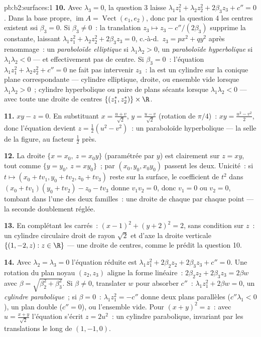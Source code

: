 \begin{solution}{pb:b2:surfaces:1}
\textbf{10.} Avec $\lambda_3 = 0$, la question 3 laisse
$\lambda_1z_1^2 + \lambda_2z_2^2 + 2\beta_3z_3 + c'' = 0$. Dans
la base propre, $\operatorname{im}A = \operatorname{Vect}(e_1,
e_2)$, donc par la question 4 les centres existent ssi $\beta_3 = 0$. Si
$\beta_3 \neq 0$~: la translation $z_3 \mapsto z_3 -
c''/(2\beta_3)$ supprime la constante, laissant $\lambda_1z_1^2
+ \lambda_2z_2^2 + 2\beta_3z_3 = 0$, c.-à-d.\ $z_3 = px^2 +
qy^2$ après renommage~: un \emph{paraboloïde elliptique} si
$\lambda_1\lambda_2 > 0$, un \emph{paraboloïde hyperbolique} si
$\lambda_1\lambda_2 < 0$ --- et effectivement pas de centre. Si
$\beta_3 = 0$~: l'équation $\lambda_1z_1^2 + \lambda_2z_2^2 +
c'' = 0$ ne fait pas intervenir $z_3$~: la  est un cylindre
sur la conique plane correspondante --- cylindre elliptique,
droite, ou ensemble vide lorsque $\lambda_1\lambda_2 > 0$~; cylindre
hyperbolique ou paire de plans sécants lorsque
$\lambda_1\lambda_2 < 0$ --- avec toute une droite de centres
$\{(z_1^*, z_2^*)\} \times \R$.

\textbf{11.} $xy - z = 0$. En substituant $x = \frac{u +
v}{\sqrt2}$, $y = \frac{u - v}{\sqrt2}$ (rotation de $\pi/4$)~:
$xy = \frac{u^2 - v^2}2$, donc l'équation devient $z =
\frac12(u^2 - v^2)$~: un paraboloïde hyperbolique --- la selle
de la figure, au facteur $\frac12$ près.

\textbf{12.} La droite $\{x = x_0,\ z = x_0y\}$ (paramétrée
par $y$) est clairement sur $z = xy$, tout comme $\{y = y_0,\ z =
xy_0\}$~; par $(x_0, y_0, x_0y_0)$ passent les deux.
Unicité~: si $t \mapsto (x_0 + tv_1, y_0 + tv_2, z_0 +
tv_3)$ reste sur la surface, le coefficient de $t^2$ dans $(x_0
+ tv_1)(y_0 + tv_2) - z_0 - tv_3$ donne $v_1v_2 = 0$, donc
$v_1 = 0$ ou $v_2 = 0$, tombant dans l'une des deux familles~:
une droite de chaque par chaque point --- la seconde  doublement
réglée.

\textbf{13.} En complétant les carrés~: $(x - 1)^2 + (y + 2)^2 = 2$,
sans condition sur $z$~: un cylindre circulaire droit de rayon
$\sqrt2$ et d'axe la droite verticale $\{(1, -2, z) : z \in
\R\}$ --- une droite de centres, comme le prédit la question 10.

\textbf{14.} Avec $\lambda_2 = \lambda_3 = 0$ l'équation réduite
est $\lambda_1z_1^2 + 2\beta_2z_2 + 2\beta_3z_3 + c''
= 0$. Une rotation du plan noyau $(z_2, z_3)$ aligne la
forme linéaire~: $2\beta_2z_2 + 2\beta_3z_3 = 2\beta w$ avec
$\beta = \sqrt{\beta_2^2 + \beta_3^2}$. Si $\beta \neq 0$,
translater $w$ pour absorber $c''$~: $\lambda_1z_1^2 + 2\beta w =
0$, un \emph{cylindre parabolique}~; si $\beta = 0$~:
$\lambda_1z_1^2 = -c''$ donne deux plans parallèles ($c''
\lambda_1 < 0$), un plan double ($c'' = 0$), ou l'ensemble
vide. Pour $(x + y)^2 = z$~: avec $u = \frac{x + y}{\sqrt2}$ l'équation
s'écrit $z = 2u^2$~: un cylindre parabolique, invariant
par les translations le long de $(1, -1, 0)$.


\end{solution}
